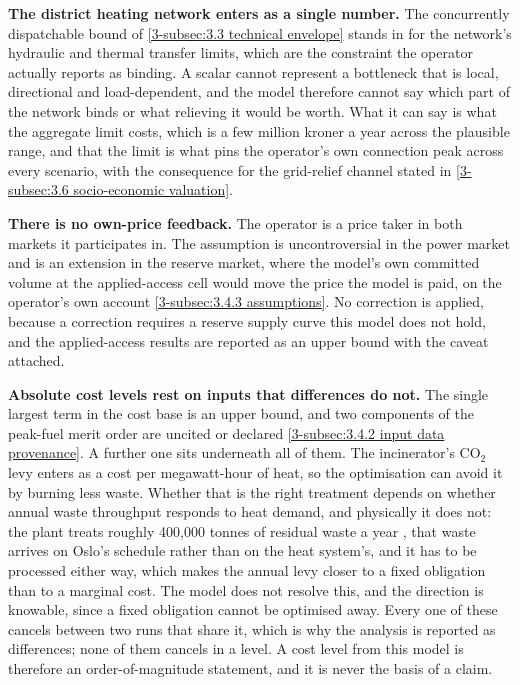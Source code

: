 \textbf{The district heating network enters as a single number.} The concurrently dispatchable bound of \autoref{3-subsec:3.3 technical envelope} stands in for the network's hydraulic and thermal transfer limits, which are the constraint the operator actually reports as binding. A scalar cannot represent a bottleneck that is local, directional and load-dependent, and the model therefore cannot say which part of the network binds or what relieving it would be worth. What it can say is what the aggregate limit costs, which is a few million kroner a year across the plausible range, and that the limit is what pins the operator's own connection peak across every scenario, with the consequence for the grid-relief channel stated in \autoref{3-subsec:3.6 socio-economic valuation}.

\textbf{There is no own-price feedback.} The operator is a price taker in both markets it participates in. The assumption is uncontroversial in the power market and is an extension in the reserve market, where the model's own committed volume at the applied-access cell would move the price the model is paid, on the operator's own account \autoref{3-subsec:3.4.3 assumptions}. No correction is applied, because a correction requires a reserve supply curve this model does not hold, and the applied-access results are reported as an upper bound with the caveat attached.

\textbf{Absolute cost levels rest on inputs that differences do not.} The single largest term in the cost base is an upper bound, and two components of the peak-fuel merit order are uncited or declared \autoref{3-subsec:3.4.2 input data provenance}. A further one sits underneath all of them. The incinerator's CO$_2$ levy enters as a cost per megawatt-hour of heat, so the optimisation can avoid it by burning less waste. Whether that is the right treatment depends on whether annual waste throughput responds to heat demand, and physically it does not: the plant treats roughly 400{,}000 tonnes of residual waste a year \cite{dsbno_bygging_2026}, that waste arrives on Oslo's schedule rather than on the heat system's, and it has to be processed either way, which makes the annual levy closer to a fixed obligation than to a marginal cost. The model does not resolve this, and the direction is knowable, since a fixed obligation cannot be optimised away. Every one of these cancels between two runs that share it, which is why the analysis is reported as differences; none of them cancels in a level. A cost level from this model is therefore an order-of-magnitude statement, and it is never the basis of a claim.

